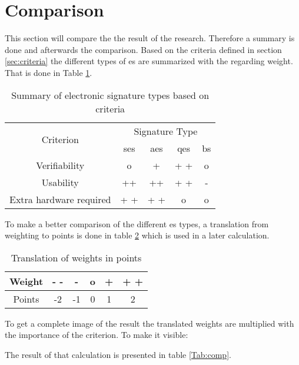 \section{Comparison} \label{sec:comp}
This section will compare the the result of the research. Therefore a summary is done and afterwards the comparison.
Based on the criteria defined in section \ref{sec:criteria} the different types of \gls{es} are summarized with the regarding weight. That is done in Table \ref{Tab:summary}.

\begin{table}[h]
	\begin{tabular}{|c|c|c|c|c|} \hline
		\multirow{2}{*}{Criterion} & \multicolumn{4}{|c|}{Signature Type} \\
								   & \gls{ses} & \gls{aes} & \gls{qes} & \gls{bs} \\ \cline{1-5}
		Verifiability & o & + & + + & o \\ \hline
		Usability & ++ & ++ & + + & - \\ \hline
		Extra hardware required & + + & + + & o & o \\ \hline
	\end{tabular}
	\centering
	\caption{Summary of electronic signature types based on criteria}
	\label{Tab:summary}
\end{table}

To make a better comparison of the different \gls{es} types, a translation from weighting to points is done in table \ref{Tab:Translation} which is used in a later calculation.

\begin{table}[h]
	\begin{tabular}{|c|c|c|c|c|c|} \hline
		Weight & - - & - & o & + & + + \\ \hline
		Points & -2 & -1 & 0 & 1 & 2 \\ \hline
	\end{tabular}
	\centering
	\caption{Translation of weights in points}
	\label{Tab:Translation}
\end{table}

To get a complete image of the result the translated weights are multiplied with the importance of the criterion. To make it visible: 

\begin{center}
\end{center}
The result of that calculation is presented in table \ref{Tab:comp}.

